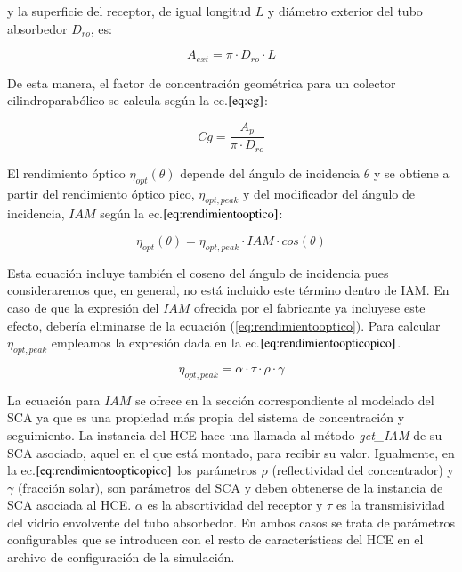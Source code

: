 y la superficie del receptor, de igual longitud $L$ y diámetro exterior del tubo absorbedor $D_{ro}$, es:

\begin{equation}
   A_{ext} = \pi \cdot D_{ro} \cdot L
    \label{eq:superficiereceptor}
\end{equation}

De esta manera,  el factor de concentración geométrica para un colector cilindroparabólico se calcula según la ec.\(\eqref{eq:cg}\):

\begin{equation}
   Cg = \frac{A_p}{\pi \cdot D_{ro}}
    \label{eq:cg}
\end{equation}


El rendimiento óptico \(\eta_{opt}(\theta)\)  depende del   ángulo de incidencia \(\theta\) y se obtiene a partir del rendimiento  óptico pico, \(\eta_{opt,peak}\) y del modificador del ángulo de   incidencia, \(IAM\) según la ec.\(\eqref{eq:rendimientooptico}\):


\begin{equation}
   \eta_{opt}(\theta) = \eta_{opt,peak} \cdot IAM \cdot cos(\theta)
    \label{eq:rendimientooptico}
\end{equation}

Esta ecuación incluye también el coseno del ángulo de incidencia pues consideraremos que, en general, no está incluido este término dentro de IAM. En caso de que la expresión del $IAM$ ofrecida por el fabricante ya incluyese este efecto, debería eliminarse de la ecuación (\ref{eq:rendimientooptico}). 
Para calcular \(\eta_{opt,peak}\) empleamos la expresión dada en la ec.\(\eqref{eq:rendimientoopticopico}\). 

\begin{equation}
   \eta_{opt,peak} = \alpha \cdot \tau \cdot \rho \cdot \gamma
    \label{eq:rendimientoopticopico}
\end{equation}

La ecuación para \(IAM\) se ofrece en la sección correspondiente al modelado del SCA ya que es una propiedad más propia del sistema de concentración y seguimiento. La instancia del HCE hace una llamada al método \emph{get\_IAM} de su SCA asociado, aquel en el que está montado, para recibir su valor. Igualmente, en la ec.\(\eqref{eq:rendimientoopticopico}\) los parámetros \(\rho\) (reflectividad del concentrador) y \(\gamma\) (fracción solar), son parámetros del SCA y deben obtenerse de la instancia de SCA asociada al HCE. \(\alpha\) es la absortividad del receptor y \(\tau\) es la transmisividad del vidrio envolvente del tubo absorbedor. En ambos casos se trata de parámetros configurables que se introducen con el resto de características del HCE en el archivo de configuración de la simulación.

